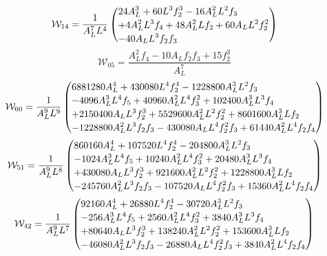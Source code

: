\documentclass[11pt,a4paper]{article}
\begin{document}
\begin{equation}
\mathcal W_{14}=\frac{1}{A_{L}^{7} L^{4}}\left(\vcenter{\hbox{\shortstack[l]{$\displaystyle 24 A_{L}^{3} + 60 L^{3} f_{2}^{3} - 16 A_{L}^{2} L^{2} f_{3}$\\
$\displaystyle + 4 A_{L}^{2} L^{3} f_{4} + 48 A_{L}^{2} L f_{2} + 60 A_{L} L^{2} f_{2}^{2}$\\
$\displaystyle - 40 A_{L} L^{3} f_{2} f_{3}$}}}\right)
\label{eq:cat-local-W-1-4}
\end{equation}
\begin{equation}
\mathcal W_{05}=\frac{A_{L}^{2} f_{4} - 10 A_{L} f_{2} f_{3} + 15 f_{2}^{3}}{A_{L}^{7}}
\label{eq:cat-local-W-0-5}
\end{equation}
\begin{equation}
\mathcal W_{60}=\frac{1}{A_{L}^{9} L^{9}}\left(\vcenter{\hbox{\shortstack[l]{$\displaystyle 6881280 A_{L}^{4} + 430080 L^{4} f_{2}^{4} - 1228800 A_{L}^{3} L^{2} f_{3}$\\
$\displaystyle - 4096 A_{L}^{3} L^{4} f_{5} + 40960 A_{L}^{2} L^{4} f_{3}^{2} + 102400 A_{L}^{3} L^{3} f_{4}$\\
$\displaystyle + 2150400 A_{L} L^{3} f_{2}^{3} + 5529600 A_{L}^{2} L^{2} f_{2}^{2} + 8601600 A_{L}^{3} L f_{2}$\\
$\displaystyle - 1228800 A_{L}^{2} L^{3} f_{2} f_{3} - 430080 A_{L} L^{4} f_{2}^{2} f_{3} + 61440 A_{L}^{2} L^{4} f_{2} f_{4}$}}}\right)
\label{eq:cat-local-W-6-0}
\end{equation}
\begin{equation}
\mathcal W_{51}=\frac{1}{A_{L}^{9} L^{8}}\left(\vcenter{\hbox{\shortstack[l]{$\displaystyle 860160 A_{L}^{4} + 107520 L^{4} f_{2}^{4} - 204800 A_{L}^{3} L^{2} f_{3}$\\
$\displaystyle - 1024 A_{L}^{3} L^{4} f_{5} + 10240 A_{L}^{2} L^{4} f_{3}^{2} + 20480 A_{L}^{3} L^{3} f_{4}$\\
$\displaystyle + 430080 A_{L} L^{3} f_{2}^{3} + 921600 A_{L}^{2} L^{2} f_{2}^{2} + 1228800 A_{L}^{3} L f_{2}$\\
$\displaystyle - 245760 A_{L}^{2} L^{3} f_{2} f_{3} - 107520 A_{L} L^{4} f_{2}^{2} f_{3} + 15360 A_{L}^{2} L^{4} f_{2} f_{4}$}}}\right)
\label{eq:cat-local-W-5-1}
\end{equation}
\begin{equation}
\mathcal W_{42}=\frac{1}{A_{L}^{9} L^{7}}\left(\vcenter{\hbox{\shortstack[l]{$\displaystyle 92160 A_{L}^{4} + 26880 L^{4} f_{2}^{4} - 30720 A_{L}^{3} L^{2} f_{3}$\\
$\displaystyle - 256 A_{L}^{3} L^{4} f_{5} + 2560 A_{L}^{2} L^{4} f_{3}^{2} + 3840 A_{L}^{3} L^{3} f_{4}$\\
$\displaystyle + 80640 A_{L} L^{3} f_{2}^{3} + 138240 A_{L}^{2} L^{2} f_{2}^{2} + 153600 A_{L}^{3} L f_{2}$\\
$\displaystyle - 46080 A_{L}^{2} L^{3} f_{2} f_{3} - 26880 A_{L} L^{4} f_{2}^{2} f_{3} + 3840 A_{L}^{2} L^{4} f_{2} f_{4}$}}}\right)
\label{eq:cat-local-W-4-2}
\end{equation}
\end{document}
